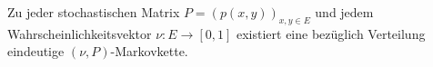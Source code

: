 \label{Existenzsatz von Markovketten}
Zu jeder stochastischen Matrix $P = (p(x,y))_{x,y \in E}$ und jedem Wahrscheinlichkeitsvektor $\nu : E \to [0,1]$ existiert eine bezüglich Verteilung eindeutige $(\nu,P)$-Markovkette.